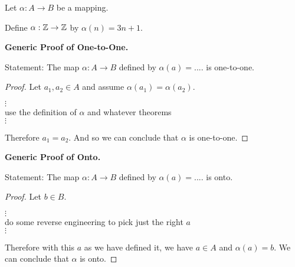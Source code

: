 \documentclass[12pt]{article}
\begin{document}
\newpage
{
	\begin{defn}
		Let $\alpha\colon A\to B$ be a mapping.
		
	\end{defn}
	\begin{exercise}
		Define $\alpha:\mathbb{Z}\to\mathbb{Z}$ by $\alpha(n)=3n+1$. 
	\end{exercise}
}
{
	{\textbf{Generic Proof of One-to-One.}}
	
		Statement: The map $\alpha:A\to B$ defined by $\alpha(a)=....$ is one-to-one.
		\begin{proof}
			Let $a_1,a_2\in A$ and assume $\alpha(a_1)=\alpha(a_2)$.
			
			\begin{center}
			$\vdots$\\
			use the definition of $\alpha$ and whatever theorems\\
			$\vdots$
			\end{center}
			
			Therefore $a_1=a_2$.  And so we can conclude that $\alpha$ is one-to-one.
		\end{proof}
		
	
}
{
	{\textbf{Generic Proof of Onto.}}
	
	Statement: The map $\alpha:A\to B$ defined by $\alpha(a)=....$ is onto.
	\begin{proof}
		Let $b\in B$.
		
		\begin{center}
			$\vdots$\\
			do some reverse engineering to pick just the right $a$\\
			$\vdots$
		\end{center}
		
		Therefore with this $a$ as we have defined it, we have $a\in A$ and $\alpha(a)=b$.  We can conclude that $\alpha$ is onto.
	\end{proof}
		
	
}
\end{document}
